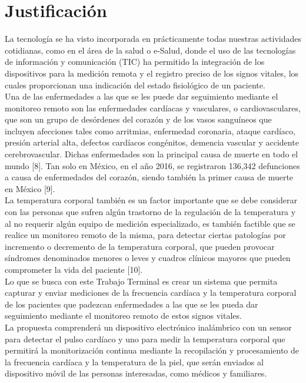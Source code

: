 \section{Justificación}
La tecnología se ha visto incorporada en prácticamente todas nuestras actividades cotidianas, como en el área de la salud o e-Salud, donde el uso de las tecnologías de información y comunicación (TIC) ha permitido la integración de los dispositivos para la medición remota y el registro preciso de los signos vitales, los cuales proporcionan una indicación del estado fisiológico de un paciente.\\

Una de las enfermedades a las que se les puede dar seguimiento mediante el monitoreo remoto son las enfermedades cardíacas y vasculares, o cardiovasculares, que son un grupo de desórdenes del corazón y de los vasos sanguíneos que incluyen afecciones tales como arritmias, enfermedad coronaria, ataque cardíaco, presión arterial alta, defectos cardíacos congénitos, demencia vascular y accidente cerebrovascular. Dichas enfermedades son la principal causa de muerte en todo el mundo  [8].  Tan solo en México, en el año 2016, se registraron 136,342 defunciones a causa de enfermedades del corazón, siendo también la primer causa de muerte en México [9].\\

La temperatura corporal también es un factor importante que se debe considerar con las personas que sufren algún trastorno de la regulación de la temperatura y al no requerir algún equipo de medición especializado, es también factible que se realice un monitoreo remoto de la misma, para detectar ciertas patologías por incremento o decremento de la temperatura corporal, que pueden provocar síndromes denominados menores o leves y cuadros clínicos mayores que pueden comprometer la vida del paciente [10].\\

Lo que se busca con este Trabajo Terminal es crear un sistema que permita capturar y enviar mediciones de la frecuencia cardíaca y la temperatura corporal de los pacientes que padezcan enfermedades a las que se les pueda dar seguimiento mediante el monitoreo remoto de estos signos vitales.\\

La propuesta comprenderá un dispositivo electrónico inalámbrico con un sensor para detectar el pulso cardíaco y uno para medir la temperatura corporal que permitirá la monitorización continua mediante la recopilación y procesamiento de la frecuencia cardíaca y la temperatura de la piel, que serán enviados al dispositivo móvil de las personas interesadas, como médicos y familiares.

